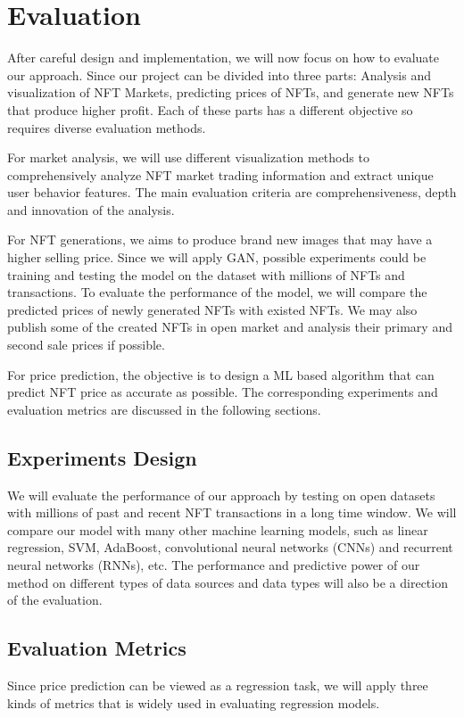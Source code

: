 \section{Evaluation}
After careful design and implementation, we will now focus on how to evaluate our approach. Since our project can be divided into three parts: Analysis and visualization of NFT Markets, predicting prices of NFTs, and generate new NFTs that produce higher profit. Each of these parts has a different objective so requires diverse evaluation methods. 

For market analysis, we will use different visualization methods to comprehensively analyze NFT market trading information and extract unique user behavior features. The main evaluation criteria are comprehensiveness, depth and innovation of the analysis.

For NFT generations, we aims to produce brand new images that may have a higher selling price. Since we will apply GAN, possible experiments could be training and testing the model on the dataset with millions of NFTs and transactions. To evaluate the performance of the model, we will compare the predicted prices of newly generated NFTs with existed NFTs. We may also publish some of the created NFTs in open market and analysis their primary and second sale prices if possible.

For price prediction, the objective is to design a ML based algorithm that can predict NFT price as accurate as possible. The corresponding experiments and evaluation metrics are discussed in the following sections.

\subsection{Experiments Design}
We will evaluate the performance of our approach by testing on open datasets with millions of past and recent NFT transactions in a long time window. We will compare our model with many other machine learning models, such as linear regression, SVM, AdaBoost, convolutional neural networks (CNNs) and recurrent neural networks (RNNs), etc. The performance and predictive power of our method on different types of data sources and data types will also be a direction of the evaluation. 

\subsection{Evaluation Metrics}
Since price prediction can be viewed as a regression task, we will apply three kinds of metrics that is widely used in evaluating regression models.

